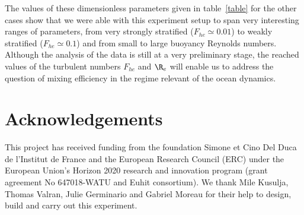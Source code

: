 \noindent The values of these dimensionless parameters given in table~\ref{table} for the
other cases show that we were able with this experiment setup to span very
interesting ranges of parameters, from very strongly stratified
($F_{he} \simeq 0.01$) to weakly stratified ($F_{he} \simeq 0.1$) and from
small to large buoyancy Reynolds numbers.
%
Although the analysis of the data is still at a very preliminary stage, the
reached values of the turbulent numbers $F_{he}$ and $\R_e$ will enable us to
address the question of mixing efficiency in the regime relevant of the ocean
dynamics.

\section*{Acknowledgements}

This project has received funding from the foundation Simone et Cino Del Duca de
l'Institut de France and the European Research Council (ERC) under the European
Union's Horizon 2020 research and innovation program (grant agreement No
647018-WATU and Euhit consortium).
%
We thank Mile Kusulja, Thomas Valran, Julie Germinario and Gabriel Moreau for
their help to design, build and carry out this experiment.


% 
% 
%
%
% 
